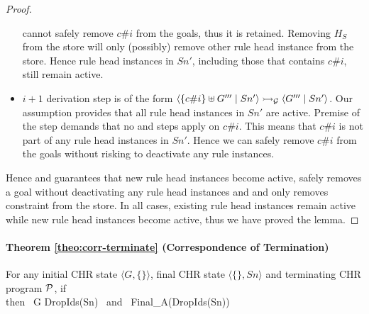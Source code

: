 \documentclass{tlp}
\begin{document}
\begin{proof}
\begin{itemize}
	        cannot safely remove $c\#i$ from the goals, thus it is retained. Removing $H_S$ from the store will 
	        only (possibly) remove other rule head instance from the store. Hence rule head instances in $Sn'$,
	        including those that contains $c\#i$, still remain active.
	  \item {} $i+1$ derivation step is of the form
	        $\langle \{c\#i\} \uplus G'''\mid Sn' \rangle \rightarrowtail_{\cal G} \langle G'''\mid Sn' \rangle$. Our assumption provides that 
	        all rule head instances in $Sn'$ are active. Premise of the  step demands that no 
	         and  steps apply on $c\#i$. This means that $c\#i$ is not part of
	        any rule head instances in $Sn'$. Hence we can safely remove $c\#i$ from the goals without risking 
	        to deactivate any rule instances.
  \end{itemize}
  Hence  and  guarantees that new rule head instances become active, 
  safely removes a goal without deactivating any rule head instances and  and 
  only removes constraint from the store. In all cases, existing rule head instances remain active while new rule
  head instances become active, thus we have proved the lemma.
\end{proof}

\paragraph{\bf Theorem \ref{theo:corr-terminate} (Correspondence of Termination)}
For any initial CHR state $\langle G,\{\} \rangle$, final CHR state $\langle \{\},Sn \rangle$ and
terminating CHR program $\cal P$,
   \mbox{if }  \partransstar {} \\
   \mbox{then } G \abstransstar DropIds(Sn) \mbox{ and } Final_{\cal A}(DropIds(Sn))
\eda
\end{document}
